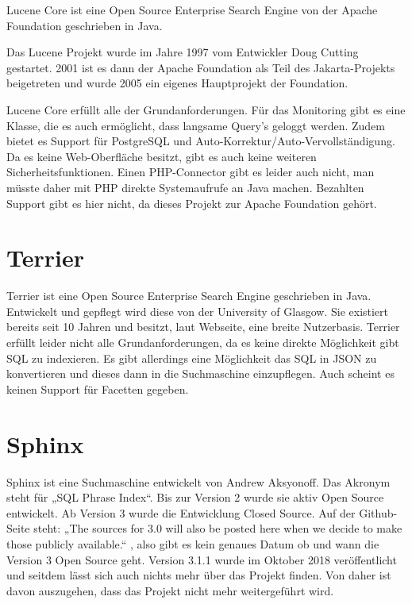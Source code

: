 Lucene Core ist eine Open Source Enterprise Search Engine von der Apache Foundation geschrieben in Java.

Das Lucene Projekt wurde im Jahre 1997 vom Entwickler Doug Cutting gestartet. 2001 ist es dann der Apache Foundation als Teil des Jakarta-Projekts beigetreten und wurde 2005 ein eigenes Hauptprojekt der Foundation. \cite{Wikipedia.2019c}

Lucene Core erfüllt alle der Grundanforderungen. Für das Monitoring gibt es eine Klasse, die es auch ermöglicht, dass langsame Query’s geloggt werden. Zudem bietet es Support für PostgreSQL und Auto-Korrektur/Auto-Vervollständigung. Da es keine Web-Oberfläche besitzt, gibt es auch keine weiteren Sicherheitsfunktionen. Einen PHP-Connector gibt es leider auch nicht, man müsste daher mit PHP direkte Systemaufrufe an Java machen. Bezahlten Support gibt es hier nicht, da dieses Projekt zur Apache Foundation gehört. \cite{TheApacheSoftwareFoundation.2019b}

\section{Terrier}
\label{terrier}

Terrier ist eine Open Source Enterprise Search Engine geschrieben in Java. Entwickelt und gepflegt wird diese von der University of Glasgow. Sie existiert bereits seit 10 Jahren und besitzt, laut Webseite, eine breite Nutzerbasis. 
Terrier erfüllt leider nicht alle Grundanforderungen, da es keine direkte Möglichkeit gibt SQL zu indexieren. Es gibt allerdings eine Möglichkeit das SQL in JSON zu konvertieren und dieses dann in die Suchmaschine einzupflegen. Auch scheint es keinen Support für Facetten gegeben.
\cite{McCreadie.2019}

\section{Sphinx}
\label{sphinx}

Sphinx ist eine Suchmaschine entwickelt von Andrew Aksyonoff. Das Akronym steht für „SQL Phrase Index“.\cite{SphinxTechnologiesInc.b} Bis zur Version 2 wurde sie aktiv Open Source entwickelt. Ab Version 3 wurde die Entwicklung Closed Source. Auf der Github-Seite steht: „The sources for 3.0 will also be posted here when we decide to make those publicly available.“ \cite{sphinxserach.2019}, also gibt es kein genaues Datum ob und wann die Version 3 Open Source geht. Version 3.1.1 wurde im Oktober 2018 veröffentlicht und seitdem lässt sich auch nichts mehr über das Projekt finden. Von daher ist davon auszugehen, dass das Projekt nicht mehr weitergeführt wird. 

